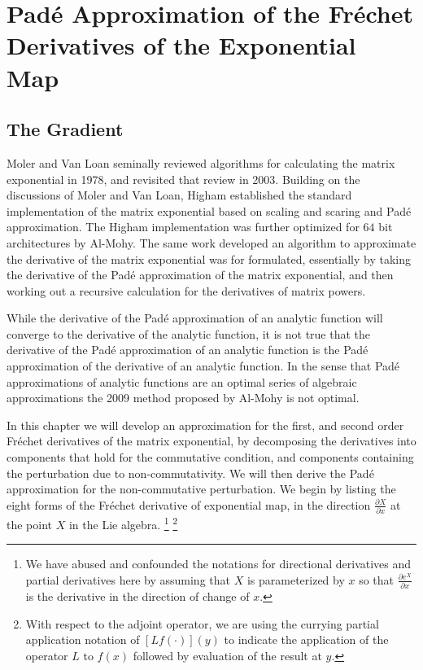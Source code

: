 \chapter{Pad\'{e} Approximation of the Fr\'{e}chet Derivatives of the Exponential Map}
\section{The Gradient}
Moler and Van Loan seminally reviewed algorithms for calculating the matrix 
exponential in 1978, and revisited that review in 2003\cite{moler_nineteen_1978,moler_nineteen_2003}. 
Building on the discussions of Moler and Van Loan, Higham established the 
standard implementation of the matrix exponential based on scaling and scaring 
and Pad\'{e} approximation\cite{higham_scaling_2005,higham_functions_2008}.
The Higham implementation was further optimized for $64$ bit architectures by 
Al-Mohy\cite{al-mohy_new_2009}. The same work developed an algorithm to 
approximate the derivative of the matrix exponential was for formulated, 
essentially by taking the derivative of the Pad\'{e} approximation of the matrix 
exponential, and then working out a recursive calculation for the derivatives of 
matrix powers\cite{al-mohy_computing_2009}.

While the derivative of the Pad\'{e} approximation of an analytic function will 
converge to the derivative of the analytic function, it is not true that the
derivative of the Pad\'{e} approximation of an analytic function is the Pad\'{e} 
approximation of the derivative of an analytic function. In the sense that 
Pad\'{e} approximations of analytic functions are an optimal series of algebraic 
approximations the 2009 method proposed by Al-Mohy is not optimal.

In this chapter we will develop an approximation for the first, and second order
Fr\'{e}chet derivatives of the matrix exponential, by decomposing the 
derivatives into components that hold for the commutative condition, and 
components containing the perturbation due to non-commutativity. We will then 
derive the Pad\'{e} approximation for the non-commutative perturbation. We begin 
by listing the eight forms of the Fr\'{e}chet derivative of exponential map, in 
the direction $\frac{\partial X}{\partial x}$ at the point $X$ in the Lie 
algebra.
\footnote{We have abused and confounded the notations for directional 
derivatives and partial derivatives here by assuming that $X$ is parameterized 
by $x$ so that $\frac{\partial e^X}{\partial x}$ is the derivative in the
direction of change of $x$.}
\footnote{With respect to the adjoint operator, we are using the currying 
partial application notation of $\left[L f\left(\cdotp\right)\right]\left(y\right)$
to indicate the application of the operator $L$ to $f\left(x\right)$ followed by
evaluation of the result at $y$.}

